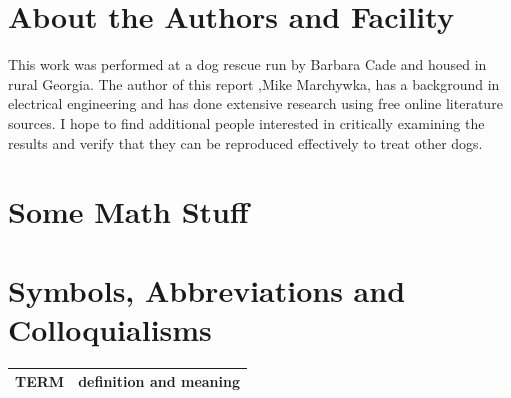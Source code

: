 \begin{mdpicomment}
\section{About the Authors and Facility}
This work was performed at a dog rescue run by Barbara Cade and
housed in rural Georgia.  The author of this report 
,Mike Marchywka,
has a background in electrical engineering and 
has done extensive research using free online literature sources.  
I hope to find additional people interested in critically 
examining the results and verify that they can be reproduced
effectively to treat other dogs.

\section{ Some Math Stuff }



\section{Symbols, Abbreviations and Colloquialisms}

\noindent
\begin{tabular}{@{}ll}
TERM & definition and meaning   \\
\hline
\end{tabular} %


\end{mdpicomment}
